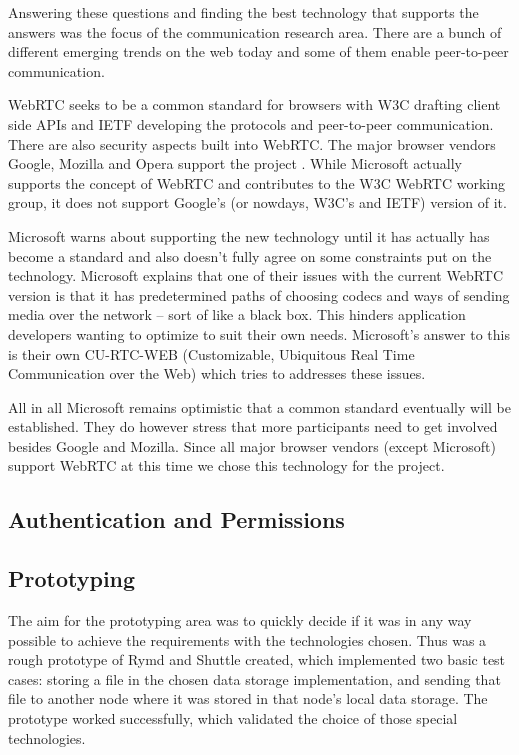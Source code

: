 Answering these questions and finding the best technology that supports the answers was the focus of the communication research area. There are a bunch of different emerging trends on the web today and some of them enable peer-to-peer communication.

WebRTC seeks to be a common standard for browsers with W3C drafting client side APIs and IETF developing the protocols and peer-to-peer communication\cite{WebRTCWorkingGroupCharter:2013:Online}. There are also security aspects built into WebRTC. The major browser vendors Google, Mozilla and Opera support the project \cite{WebRTCAndMicrosoft:2012:Online}. While Microsoft actually supports the concept of WebRTC and contributes to the W3C WebRTC working group, it does not support Google’s (or nowdays, W3C’s and IETF) version of it\cite{WebRTCAndMicrosoft:2012:Online}.

Microsoft warns about supporting the new technology until it has actually has become a standard and also doesn’t fully agree on some constraints put on the technology\cite{WebRTCAndMicrosoft:2012:Online}. Microsoft explains that one of their issues with the current WebRTC version is that it has predetermined paths of choosing codecs and ways of sending media over the network – sort of like a black box. This hinders application developers wanting to optimize to suit their own needs. Microsoft’s answer to this is their own CU-RTC-WEB (Customizable, Ubiquitous Real Time Communication over the Web) which tries to addresses these issues.

All in all Microsoft remains optimistic that a common standard eventually will be established\cite{WebRTCAndMicrosoft:2012:Online}. They do however stress that more participants need to get involved besides Google and Mozilla. Since all major browser vendors (except Microsoft) support WebRTC at this time we chose this technology for the project.

\subsection{Authentication and Permissions}


\subsection{Prototyping}

The aim for the prototyping area was to quickly decide if it was in any way possible to achieve the requirements with the technologies chosen. Thus was a rough prototype of Rymd and Shuttle created, which implemented two basic test cases: storing a file in the chosen data storage implementation, and sending that file to another node where it was stored in that node's local data storage. The prototype worked successfully, which validated the choice of those special technologies.

